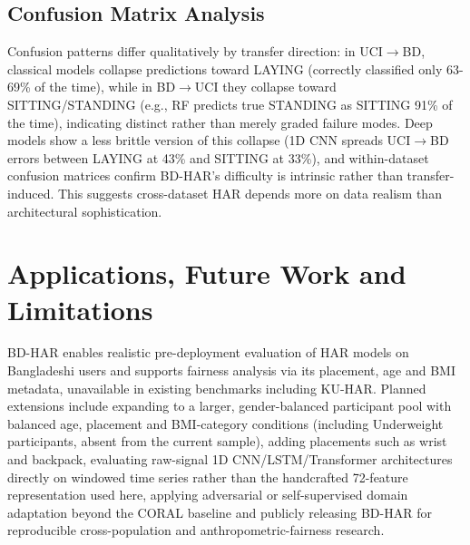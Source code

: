 \documentclass[conference]{IEEEtran}
\begin{document}
\subsection{Confusion Matrix Analysis}
\label{sec:confusion}

Confusion patterns differ qualitatively by transfer direction: in
UCI$\rightarrow$BD, classical models collapse predictions toward
LAYING (correctly classified only 63-69\% of the time), while in
BD$\rightarrow$UCI they collapse toward SITTING/STANDING (e.g., RF
predicts true STANDING as SITTING 91\% of the time), indicating
distinct rather than merely graded failure modes. Deep models show a
less brittle version of this collapse (1D CNN spreads UCI$\rightarrow$BD
errors between LAYING at 43\% and SITTING at 33\%), and
within-dataset confusion matrices confirm BD-HAR's difficulty is
intrinsic rather than transfer-induced. This suggests cross-dataset HAR depends more on data realism than architectural sophistication.

\section{Applications, Future Work and Limitations}
\label{sec:applications}

BD-HAR enables realistic pre-deployment evaluation of HAR models on
Bangladeshi users and supports fairness analysis via its placement,
age and BMI metadata, unavailable in existing benchmarks including
KU-HAR. Planned extensions include expanding to a larger,
gender-balanced participant pool with balanced age, placement and
BMI-category conditions (including Underweight participants, absent
from the current sample), adding placements such as wrist and
backpack, evaluating raw-signal 1D CNN/LSTM/Transformer architectures
directly on windowed time series rather than the handcrafted
72-feature representation used here, applying adversarial or
self-supervised domain adaptation beyond the CORAL baseline and
publicly releasing BD-HAR for reproducible cross-population and
anthropometric-fairness research.
\end{document}

